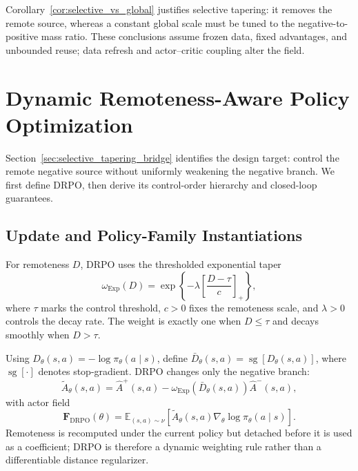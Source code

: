 \documentclass[sigconf,anonymous,review]{acmart}
\theoremstyle{acmdefinition}
\begin{document}
Corollary~\ref{cor:selective_vs_global} justifies selective tapering: it
removes the remote source, whereas a constant global scale must be tuned to
the negative-to-positive mass ratio. These conclusions assume frozen data,
fixed advantages, and unbounded reuse; data refresh and actor--critic
coupling alter the field.

\section{Dynamic Remoteness-Aware Policy Optimization}
\label{sec:drpo}

Section~\ref{sec:selective_tapering_bridge} identifies the design target:
control the remote negative source without uniformly weakening the negative
branch. We first define DRPO, then derive its control-order hierarchy and
closed-loop guarantees.

\subsection{Update and Policy-Family Instantiations}
\label{subsec:drpo_update}

For remoteness \(D\), DRPO uses the thresholded exponential taper
\begin{equation}
    \omega_{\mathrm{Exp}}(D)
    =
    \exp
    \left\{
        -\lambda
        \left[
            \frac{D-\tau}{c}
        \right]_{+}
    \right\},
    \label{eq:drpo_exp_weight}
\end{equation}
where \(\tau\) marks the control threshold, \(c>0\) fixes the remoteness
scale, and \(\lambda>0\) controls the decay rate. The weight is exactly one
when \(D\leq\tau\) and decays smoothly when \(D>\tau\).

Using \(D_\theta(s,a)=-\log\pi_\theta(a\mid s)\), define
\(\bar D_\theta(s,a)=\operatorname{sg}[D_\theta(s,a)]\), where
\(\operatorname{sg}[\cdot]\) denotes stop-gradient. DRPO changes only the
negative branch:
\begin{equation}
    \widetilde A_{\theta}(s,a)
    =
    \widehat A^{+}(s,a)
    -
    \omega_{\mathrm{Exp}}
    \!\left(\bar D_\theta(s,a)\right)
    \widehat A^{-}(s,a),
    \label{eq:drpo_effective_advantage}
\end{equation}
with actor field
\begin{equation}
    \mathbf F_{\mathrm{DRPO}}(\theta)
    =
    \mathbb E_{(s,a)\sim\nu}
    \left[
        \widetilde A_{\theta}(s,a)
        \nabla_\theta\log\pi_\theta(a\mid s)
    \right].
    \label{eq:drpo_actor_field}
\end{equation}
Remoteness is recomputed under the current policy but detached before it is
used as a coefficient; DRPO is therefore a dynamic weighting rule rather than
a differentiable distance regularizer.
\end{document}
